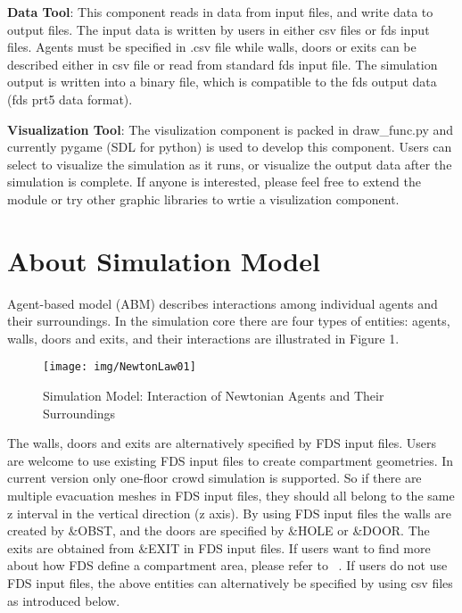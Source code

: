 \documentclass[english]{article}
\begin{document}
\textbf{Data Tool}: This component reads in data from input files,
and write data to output files. The input data is written by users
in either csv files or fds input files. Agents must be specified in
.csv file while walls, doors or exits can be described either in csv
file or read from standard fds input file. The simulation output is
written into a binary file, which is compatible to the fds output
data (fds prt5 data format). 

\textbf{Visualization Tool}: The visulization component is packed
in draw\_func.py and currently pygame (SDL for python) is used to
develop this component. Users can select to visualize the simulation
as it runs, or visualize the output data after the simulation is complete.
If anyone is interested, please feel free to extend the module or
try other graphic libraries to wrtie a visulization component.

\section{About Simulation Model}

Agent-based model (ABM) describes interactions among individual agents
and their surroundings. In the simulation core there are four types
of entities: agents, walls, doors and exits, and their interactions
are illustrated in Figure 1.

\begin{figure}
\centerline{\texttt{[image: img/NewtonLaw01]}}
\caption{Simulation Model: Interaction of Newtonian Agents and Their Surroundings}

\label{Fig_SimulationModel} 
\end{figure}

The walls, doors and exits are alternatively specified by FDS input
files. Users are welcome to use existing FDS input files to create
compartment geometries. In current version only one-floor crowd simulation is supported. So if there are multiple evacuation meshes in FDS input files, they should all belong to the same z interval in the vertical direction (z axis). By using FDS input files the walls are created by \&OBST, and the doors are specified by \&HOLE or \&DOOR. The exits
are obtained from \&EXIT in FDS input files. If users want to find
more about how FDS define a compartment area, please refer to ~\cite{FDS_UserGuide}.
If users do not use FDS input files, the above entities can alternatively
be specified by using csv files as introduced below.
\end{document}
